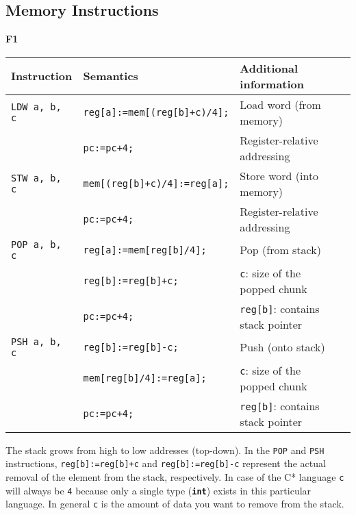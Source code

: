 \subsection*{Memory Instructions}

\par{
    \noindent
    \textbf{F1}
}

\par{
    \noindent
    \begin{tabular}{llll}
        \hline
        Instruction 			& Semantics 							& Additional information 								\\
        \hline
        \hline
        \texttt{LDW a, b, c}    &   \texttt{reg[a]:=mem[(reg[b]+c)/4];} &   Load word (from memory)                             \\
                                &   \texttt{pc:=pc+4;}                  &   Register-relative addressing                        \\
        \texttt{STW a, b, c}    &   \texttt{mem[(reg[b]+c)/4]:=reg[a];} &   Store word (into memory)                            \\
                                &   \texttt{pc:=pc+4;}                  &   Register-relative addressing                        \\
        \texttt{POP a, b, c}    &   \texttt{reg[a]:=mem[reg[b]/4];}     &   Pop (from stack)                                    \\
                                &   \texttt{reg[b]:=reg[b]+c;}          &   \texttt{c}: size of the popped chunk                \\
                                &   \texttt{pc:=pc+4;}                  &   \texttt{reg[b]}: contains stack pointer             \\
        \texttt{PSH a, b, c}    &   \texttt{reg[b]:=reg[b]-c;}          &   Push (onto stack)                                   \\
                                &   \texttt{mem[reg[b]/4]:=reg[a];}     &   \texttt{c}: size of the popped chunk                \\
                                &   \texttt{pc:=pc+4;}                  &   \texttt{reg[b]}: contains stack pointer             \\
        \hline
    \end{tabular}   
}

\par{
    \noindent
    The stack grows from high to low addresses (top-down). In the \texttt{POP} and \texttt{PSH} instructions, \texttt{reg[b]:=reg[b]+c} and \texttt{reg[b]:=reg[b]-c} represent the actual removal of the element from the stack, respectively. In case of the C* language \texttt{c} will always be \texttt{4} because only a single type (\textbf{\texttt{int}}) exists in this particular language. In general \texttt{c} is the amount of data you want to remove from the stack.
}

